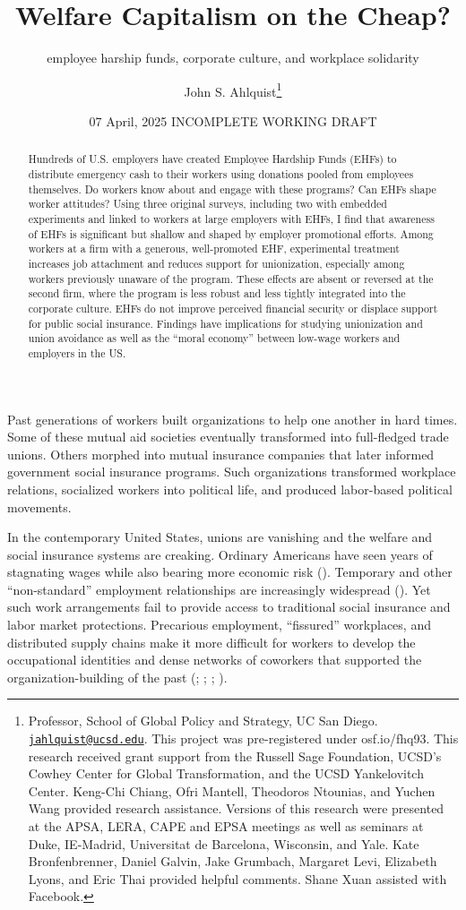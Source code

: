 \documentclass[
  11pt,
  oneside]{article}
\title{Welfare Capitalism on the Cheap?}
\subtitle{employee harship funds, corporate culture, and workplace solidarity}
\author{John S. Ahlquist\footnote{Professor, School of Global Policy and Strategy, UC San Diego. \href{mailto:jahlquist@ucsd.edu}{\nolinkurl{jahlquist@ucsd.edu}}. This project was pre-registered under osf.io/fhq93. This research received grant support from the Russell Sage Foundation, UCSD's Cowhey Center for Global Transformation, and the UCSD Yankelovitch Center. Keng-Chi Chiang, Ofri Mantell, Theodoros Ntounias, and Yuchen Wang provided research assistance. Versions of this research were presented at the APSA, LERA, CAPE and EPSA meetings as well as seminars at Duke, IE-Madrid, Universitat de Barcelona, Wisconsin, and Yale. Kate Bronfenbrenner, Daniel Galvin, Jake Grumbach, Margaret Levi, Elizabeth Lyons, and Eric Thai provided helpful comments. Shane Xuan assisted with Facebook.}}
\date{07 April, 2025 INCOMPLETE WORKING DRAFT}
\begin{document}
\maketitle

\begin{abstract}
\begin{singlespace} 

Hundreds of U.S. employers have created Employee Hardship Funds (EHFs) to distribute emergency cash to their workers using donations pooled from employees themselves. Do workers know about and engage with these programs? Can EHFs shape worker attitudes? Using three original surveys, including two with embedded experiments and linked to workers at large employers with EHFs, I find that awareness of EHFs is significant but shallow and shaped by employer promotional efforts. Among workers at a firm with a generous, well-promoted EHF, experimental treatment increases job attachment and reduces support for unionization, especially among workers previously unaware of the program. These effects are absent or reversed at the second firm, where the program is less robust and less tightly integrated into the corporate culture. EHFs do not improve perceived financial security or displace support for public social insurance. Findings have implications for studying unionization and union avoidance as well as the ``moral economy'' between low-wage workers and employers in the US.\\


\end{singlespace}
\end{abstract}

Past generations of workers built organizations to help one another in hard times. Some of these mutual aid societies eventually transformed into full-fledged trade unions. Others morphed into mutual insurance companies that later informed government social insurance programs. Such organizations transformed workplace relations, socialized workers into political life, and produced labor-based political movements.

In the contemporary United States, unions are vanishing and the welfare and social insurance systems are creaking. Ordinary Americans have seen years of stagnating wages while also bearing more economic risk (). Temporary and other ``non-standard'' employment relationships are increasingly widespread (). Yet such work arrangements fail to provide access to traditional social insurance and labor market protections. Precarious employment, ``fissured'' workplaces, and distributed supply chains make it more difficult for workers to develop the occupational identities and dense networks of coworkers that supported the organization-building of the past (; ; ; ).
\end{document}
